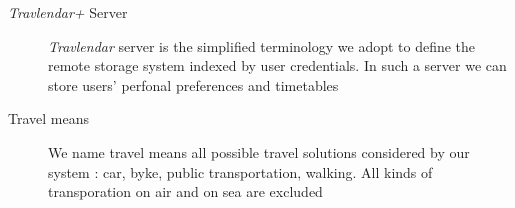 \begin{description}
				\item [\textit{Travlendar+} Server] \textit{Travlendar} server is the simplified terminology we adopt to define the remote storage system indexed by user credentials. In such a server we can store users' perfonal preferences and timetables  
				\item [Travel means] We name travel means all possible travel solutions considered by our system : car, byke, public transportation, walking. All kinds of transporation on air and on sea are excluded
\end{description}
